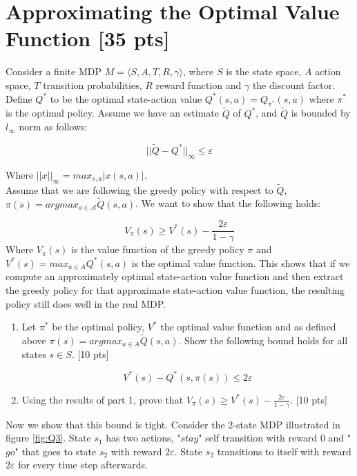 \documentclass[11pt]{article}
\let\epsilon\varepsilon
\begin{document}
\section{Approximating the Optimal Value Function [35 pts]}
Consider a finite MDP $M=\langle S, A, T, R, \gamma \rangle$, where $S$ is the state space, $A$ action space, $T$ transition probabilities, $R$ reward function and $\gamma$ the discount factor. Define $Q^*$ to be the optimal state-action value $Q^*(s,a) = Q_{\pi^*}(s,a)$ where $\pi^*$ is the optimal policy. Assume we have an estimate $\tilde{Q}$ of $Q^*$, and $\tilde{Q}$ is bounded by $l_{\infty}$ norm as follows:

\begin{equation}
||\tilde{Q} - Q^*||_{\infty} \leq \epsilon
\end{equation}

\noindent Where $||x||_{\infty} = max_{s,a} |x(s,a)|$.\\

\noindent Assume that we are following the greedy policy with respect to $\tilde{Q}$, $\pi(s) = argmax_{a\in \mathcal{A}} \tilde{Q}(s,a)$. We want to show that the following holds:

\begin{equation}\label{eq:Q3} 
V_{\pi}(s) \geq V^*(s) - \frac{2\epsilon}{1-\gamma}
\end{equation}
\noindent Where $V_{\pi}(s)$ is the value function of the greedy policy $\pi$ and $V^*(s)=max_{a \in A} Q^*(s,a)$ is the optimal value function. This shows that if we compute an approximately optimal state-action value
function and then extract the greedy policy for that approximate state-action value
function, the resulting policy still does well in the real MDP.

\begin{enumerate}[label=(\alph*)]
\item Let $\pi^*$ be the optimal policy, $V^*$ the optimal value function and as defined above $\pi(s) = argmax_{a\in A} \tilde{Q}(s,a)$. Show the following bound holds for all states $s \in S$. [10 pts]

$$V^*(s) - Q^*(s, \pi(s)) \leq 2 \epsilon$$


\item Using the results of part 1, prove that $V_{\pi}(s) \geq V^*(s) - \frac{2\epsilon}{1-\gamma}$. [10 pts]


\end{enumerate}

\noindent Now we show that this bound is tight. Consider the 2-state MDP illustrated in figure \ref{fig:Q3}. State $s_1$ has two actions, "$stay$" self transition with reward 0 and "$go$" that goes to state $s_2$ with reward $2\epsilon$. State $s_2$ transitions to itself with reward $2\epsilon$ for every time step afterwards.
\end{document}
